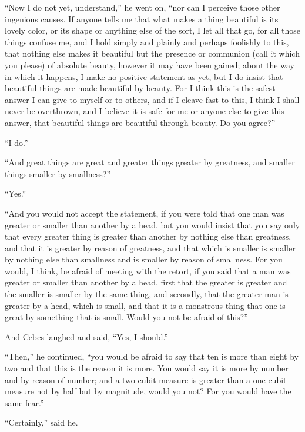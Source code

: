 \documentclass[letterpaper,12pt]{article}
\newcommand{\stephpag}[1]{\marginnote{\small\itshape\fontfamily{ppl}\selectfont #1}}
\begin{document}
\begin{drama}
``Now I do not yet, understand,'' he went on, ``nor can I perceive those other ingenious causes. If anyone tells me that what makes a thing beautiful is its lovely color, \stephpag{d} or its shape or anything else of the sort, I let all that go, for all those things confuse me, and I hold simply and plainly and perhaps foolishly to this, that nothing else makes it beautiful but the presence or communion (call it which you please) of absolute beauty, however it may have been gained; about the way in which it happens, I make no positive statement as yet, but I do insist that beautiful things are made beautiful by beauty. For I think this is the safest answer I can give to myself or to others, and if I cleave fast to this, \stephpag{e} I think I shall never be overthrown, and I believe it is safe for me or anyone else to give this answer, that beautiful things are beautiful through beauty. Do you agree?''
 
``I do.''
 
``And great things are great and greater things greater by greatness, and smaller things smaller by smallness?''
 
``Yes.''
 
``And you would not accept the statement, if you were told that one man was greater or smaller than another by a head, \stephpag{101 a} but you would insist that you say only that every greater thing is greater than another by nothing else than greatness, and that it is greater by reason of greatness, and that which is smaller is smaller by nothing else than smallness and is smaller by reason of smallness. For you would, I think, be afraid of meeting with the retort, if you said that a man was greater or smaller than another by a head, first that the greater is greater and the smaller is smaller by the same thing, and secondly, that \stephpag{b} the greater man is greater by a head, which is small, and that it is a monstrous thing that one is great by something that is small. Would you not be afraid of this?''
 
And Cebes laughed and said, ``Yes, I should.''
 
``Then,'' he continued, ``you would be afraid to say that ten is more than eight by two and that this is the reason it is more. You would say it is more by number and by reason of number; and a two cubit measure is greater than a one-cubit measure not by half but by magnitude, would you not? For you would have the same fear.''
 
``Certainly,'' said he.
 

\end{drama}
\end{document}
